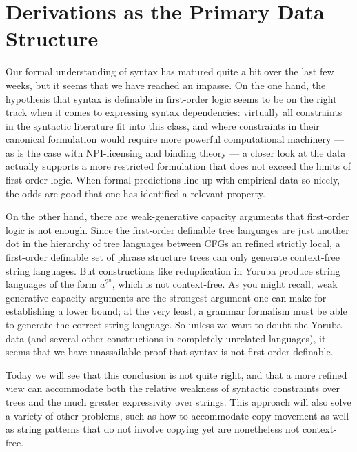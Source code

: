 \chapter{Derivations as the Primary Data Structure}
\label{cha:Derivations}

Our formal understanding of syntax has matured quite a bit over the last few weeks, but it seems that we have reached an impasse. 
On the one hand, the hypothesis that syntax is definable in first-order logic seems to be on the right track when it comes to expressing syntax dependencies: virtually all constraints in the syntactic literature fit into this class, and where constraints in their canonical formulation would require more powerful computational machinery --- as is the case with NPI-licensing and binding theory --- a closer look at the data actually supports a more restricted formulation that does not exceed the limits of first-order logic.
When formal predictions line up with empirical data so nicely, the odds are good that one has identified a relevant property.

On the other hand, there are weak-generative capacity arguments that first-order logic is not enough.
Since the first-order definable tree languages are just another dot in the hierarchy of tree languages between CFGs an refined strictly local, a first-order definable set of phrase structure trees can only generate context-free string languages. 
But constructions like reduplication in Yoruba \citep{Kobele06} produce string languages of the form $a^{2^n}$, which is not context-free.
As you might recall, weak generative capacity arguments are the strongest argument one can make for establishing a lower bound; at the very least, a grammar formalism must be able to generate the correct string language.
So unless we want to doubt the Yoruba data (and several other constructions in completely unrelated languages), it seems that we have unassailable proof that syntax is not first-order definable.

Today we will see that this conclusion is not quite right, and that a more refined view can accommodate both the relative weakness of syntactic constraints over trees and the much greater expressivity over strings.
This approach will also solve a variety of other problems, such as how to accommodate copy movement as well as string patterns that do not involve copying yet are nonetheless not context-free.

